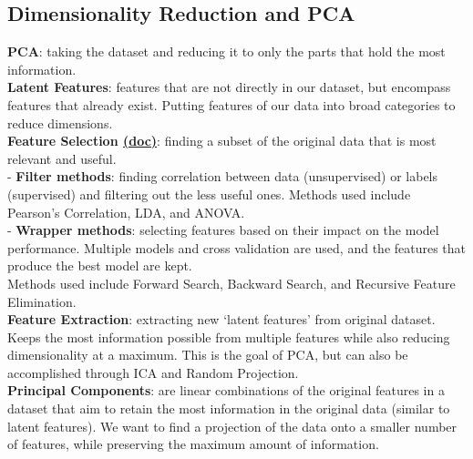 \documentclass[11pt, a4paper]{article}
\begin{document}
\begin{spacing}{1.1}
	\subsection{Dimensionality Reduction and PCA}
	\textbf{PCA}: taking the dataset and reducing it to only the parts that hold the most information. \vspace*{2mm}\\
	\textbf{Latent Features}: features that are not directly in our dataset, but encompass features that already exist. Putting features of our data into broad categories to reduce dimensions. \vspace*{2mm}\\
	\textbf{Feature Selection \href{https://scikit-learn.org/stable/modules/feature\_selection.html}{(doc)}}: finding a subset of the original data that is most relevant and useful. \vspace*{.5mm}\\
	\hspace*{3mm} - \textbf{Filter methods}: finding correlation between data (unsupervised) or labels (supervised) and filtering \hspace*{5mm} out the less useful ones. Methods used include Pearson's Correlation, LDA, and ANOVA.\vspace*{.5mm}\\
	\hspace*{3mm} - \textbf{Wrapper methods}: selecting features based on their impact on the model performance. Multiple \hspace*{6mm} models and cross validation are used, and the features that produce the best model are kept. \\ \hspace*{6mm} Methods used include Forward Search, Backward Search, and Recursive Feature Elimination. \vspace*{2mm}\\
	\textbf{Feature Extraction}: extracting new `latent features' from original dataset. Keeps the most information possible from multiple features while also reducing dimensionality at a maximum. This is the goal of PCA, but can also be accomplished through ICA and Random Projection. \vspace*{2mm}\\
	\textbf{Principal Components}: are linear combinations of the original features in a dataset that aim to retain the most information in the original data (similar to latent features). We want to find a projection of the data onto a smaller number of features, while preserving the maximum amount of information. \newpage


\end{spacing}
\end{document}
